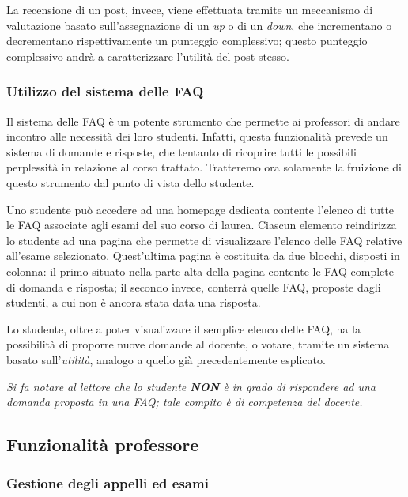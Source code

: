 \documentclass [a4paper,11pt]{book}
\begin{document}
La recensione di un post, invece, viene effettuata tramite un meccanismo di valutazione basato sull'assegnazione di un \emph{up} o di un \emph{down}, che incrementano o decrementano rispettivamente un punteggio complessivo; questo punteggio complessivo andrà a caratterizzare l'utilità del post stesso.

\medskip

\subsubsection{Utilizzo del sistema delle FAQ}

Il sistema delle FAQ è un potente strumento che permette ai professori di andare incontro alle necessità dei loro studenti. Infatti, questa funzionalità prevede un sistema di domande e risposte, che tentanto di ricoprire tutti le possibili perplessità in relazione al corso trattato. Tratteremo ora solamente la fruizione di questo strumento dal punto di vista dello studente.

Uno studente può accedere ad una homepage dedicata contente l'elenco di tutte le FAQ associate agli esami del suo corso di laurea. Ciascun elemento reindirizza lo studente ad una pagina che permette di visualizzare l'elenco delle FAQ relative all'esame selezionato. Quest'ultima pagina è costituita da due blocchi, disposti in colonna: il primo situato nella parte alta della pagina contente le FAQ complete di domanda e risposta; il secondo invece, conterrà quelle FAQ, proposte dagli studenti, a cui non è ancora stata data una risposta.

Lo studente, oltre a poter visualizzare il semplice elenco delle FAQ, ha la possibilità di proporre nuove domande al docente, o votare, tramite un sistema basato sull'\emph{utilità}, analogo a quello già precedentemente esplicato. 

\emph{Si fa notare al lettore che lo studente \textbf{NON} è in grado di rispondere ad una domanda proposta in una FAQ; tale compito è di competenza del docente.}

\medskip

\subsection{Funzionalità professore}

\subsubsection{Gestione degli appelli ed esami}
\end{document}
